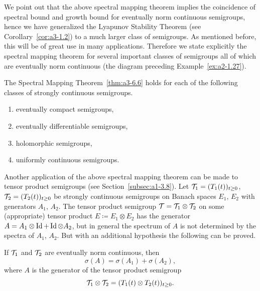 We point out that the above spectral mapping theorem implies the coincidence of spectral bound and growth bound for eventually norm continuous semigroups, hence we have generalized the Lyapunov Stability Theorem (see Corollary~\ref{cor:a3-1.2}) to a much larger class of semigroups.
As mentioned before, this will be of great use in many applications.
Therefore we state explicitly the spectral mapping theorem for several important classes of semigroups all of which are eventually norm continuous (\cf the diagram preceding Example~\ref{ex:a2-1.27}).
\begin{corollary}\label{cor:a3-6.7}
The Spectral Mapping Theorem~\ref{thm:a3-6.6}
holds for each of the following classes of strongly continuous semigroups.
\begin{enumerate}[\upshape (i)]
\item 
eventually compact semigroups,

\item 
eventually differentiable semigroups,

\item 
holomorphic semigroups,

\item 
uniformly continuous semigroups.
\end{enumerate}
\end{corollary}
Another application of the above spectral mapping theorem can be made to tensor product semigroups (see Section~\ref{subsec:a1-3.8}).
Let $\TT_{1} = (T_{1}(t))_{t\geq 0}$, $\TT_{2} = (T_{2}(t))_{t\geq 0}$ be strongly continuous semigroups on Banach spaces $E_{1}$, $E_{2}$ with generators $A_{1}$, $A_{2}$.
The tensor product semigroup $\mathcal{T} = \mathcal{T}_{1} \otimes \mathcal{T}_{2}$ on some (appropriate) tensor product $E \coloneq E_{1} \otimes E_{2}$ has the generator $A = A_{1}\otimes\operatorname{Id} + \operatorname{Id}\otimes A_{2}$, but in general the spectrum of\/ $A$ is not determined by the spectra of\/ $A_{1}$, $A_{2}$.
But with an additional hypothesis the following can be proved.
%
\begin{corollary}\label{cor:a3-6.8}
If\/ $\mathcal{T}_{1}$ and $\mathcal{T}_{2}$ are eventually norm continuous, then
\[
	\sigma(A) = \sigma(A_{1}) + \sigma(A_{2}) ,
\]
where $A$ is the generator of the tensor product semigroup
\[
	\TT_{1} \otimes \TT_{2} = (T_{1}(t) \otimes T_{2}(t))_{t\geq 0} .
\]
\end{corollary}
